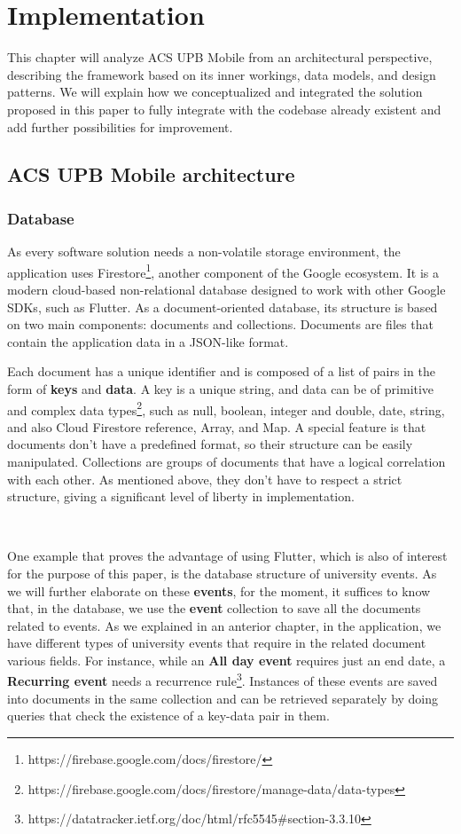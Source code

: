 \chapter{Implementation} \label{chapter5}

This chapter will analyze ACS UPB Mobile from an architectural perspective, describing the framework based on its inner workings, data models, and design patterns. We will explain how we conceptualized and integrated the solution proposed in this paper to fully integrate with the codebase already existent and add further possibilities for improvement. 

\section{ACS UPB Mobile architecture} \label{4:app}

    \subsection{Database} \label{4:app:database}
 As every software solution needs a non-volatile storage environment, the application uses Firestore\footnote{https://firebase.google.com/docs/firestore/}, another component of the Google ecosystem. It is a modern cloud-based non-relational database designed to work with other Google SDKs, such as Flutter.
As a document-oriented database, its structure is based on two main components: documents and collections. Documents are files that contain the application data in a JSON-like format. 

Each document has a unique identifier and is composed of a list of pairs in the form of \textbf{keys} and \textbf{data}. A key is a unique string, and data can be of primitive and complex data types\footnote{https://firebase.google.com/docs/firestore/manage-data/data-types}, such as null, boolean, integer and double, date, string, and also Cloud Firestore reference, Array, and Map. A special feature is that documents don’t have a predefined format, so their structure can be easily manipulated.    
Collections are groups of documents that have a logical correlation with each other. As mentioned above, they don’t have to respect a strict structure, giving a significant level of liberty in implementation. 

~

One example that proves the advantage of using Flutter, which is also of interest for the purpose of this paper, is the database structure of university events.
As we will further elaborate on these \textbf{events}, for the moment, it suffices to know that, in the database, we use the \textbf{event} collection to save all the documents related to events. As we explained in an anterior chapter, in the application, we have different types of university events that require in the related document various fields. For instance, while an \textbf{All day event} requires just an end date, a \textbf{Recurring event} needs a recurrence rule\footnote{https://datatracker.ietf.org/doc/html/rfc5545\#section-3.3.10}. Instances of these events are saved into documents in the same collection and can be retrieved separately by doing queries that check the existence of a key-data pair in them.

